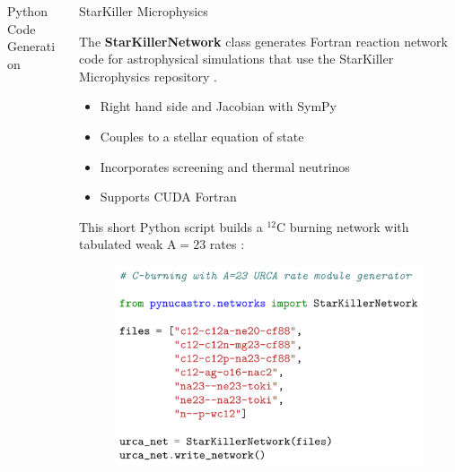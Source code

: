 \documentclass[final]{beamer}
\newlength{\onecolwid}
\newlength{\twocolwid}
\newcommand{\isot}[2]{$^{#2}\mathrm{#1}$}
\begin{document}
\begin{frame}[t]
\begin{columns}[t]
\begin{column}{\twocolwid}
\begin{columns}[t,totalwidth=\twocolwid]
\begin{column}{\onecolwid}
\begin{block}{Python Code Generation}
\end{block}



\end{column} %

\begin{column}{\onecolwid}\vspace{-.6in} %


\begin{block}{StarKiller Microphysics}

The \textbf{StarKillerNetwork} class generates Fortran reaction
network code for astrophysical simulations that use the StarKiller
Microphysics repository \cite{Zingale.astronum.2017}.

\begin{itemize}
    \item Right hand side and Jacobian with SymPy \cite{SymPy.2017}
    \item Couples to a stellar equation of state
    \item Incorporates screening and thermal neutrinos
    \item Supports CUDA Fortran
\end{itemize}

This short Python script builds a \isot{C}{12} burning network with tabulated weak $\mathrm{A=23}$ rates \cite{Suzuki.2016}:

\begin{figure}
\includegraphics[width=0.8\linewidth]{figures/starkiller-network/starkiller-urca-network.png}
\end{figure}


\end{block}
\end{column}
\end{columns}
\end{column}
\end{columns}
\end{frame}
\end{document}
